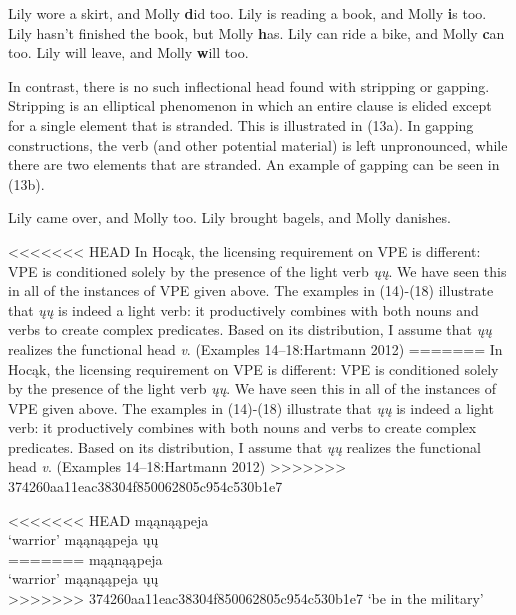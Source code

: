 \documentclass[output=paper]{LSP/langsci}
\begin{document}
\begin{exe}
\ex
\begin{xlist}
\ex
Lily wore a skirt, and Molly {\textbf did} too.
\ex
Lily is reading a book, and Molly {\textbf is} too.
\ex
Lily hasn't finished the book, but Molly {\textbf has}.
\ex
Lily can ride a bike, and Molly {\textbf can} too.
\ex
Lily will leave, and Molly {\textbf will} too.
\end{xlist}
\end{exe}


In contrast, there is no such inflectional head found with stripping or gapping. Stripping is an elliptical phenomenon in which an entire clause is elided except for a single element that is stranded. This is illustrated in (13a). In gapping constructions, the verb (and other potential material) is left unpronounced, while there are two elements that are stranded. An example of gapping can be seen in (13b).

\begin{exe}
\ex
\begin{xlist}
\ex
Lily came over, and Molly too.
\ex
Lily brought bagels, and Molly danishes.
\end{xlist}
\end{exe}

<<<<<<< HEAD
In Hocąk, the licensing requirement on VPE is different: VPE is conditioned solely by the presence of the light verb \emph{ųų}. We have seen this in all of the instances of VPE given above. The examples in (14)-(18) illustrate that \emph{ųų} is indeed a light verb: it productively combines with both nouns and verbs to create complex predicates. Based on its distribution, I assume that \emph{ųų} realizes the functional head \emph{v}. (Examples 14--18:Hartmann 2012)
=======
In Hoc\k{a}k, the licensing requirement on VPE is different: VPE is conditioned solely by the presence of the light verb \emph{\k{u}\k{u}}. We have seen this in all of the instances of VPE given above. The examples in (14)-(18) illustrate that \emph{\k{u}\k{u}} is indeed a light verb: it productively combines with both nouns and verbs to create complex predicates. Based on its distribution, I assume that \emph{\k{u}\k{u}} realizes the functional head \emph{v}. (Examples 14--18:Hartmann 2012)
>>>>>>> 374260aa11eac38304f850062805c954c530b1e7

\begin{exe}
\ex
\begin{multicols}{2}
\begin{xlist}
\ex
<<<<<<< HEAD
mąąnąąpeja\\
`warrior'
\ex
mąąnąąpeja ųų\\
=======
m\k{a}\k{a}n\k{a}\k{a}peja\\
`warrior'
\ex
m\k{a}\k{a}n\k{a}\k{a}peja \k{u}\k{u}\\
>>>>>>> 374260aa11eac38304f850062805c954c530b1e7
`be in the military'
\end{xlist}
\end{multicols}
\end{exe}
\end{document}

